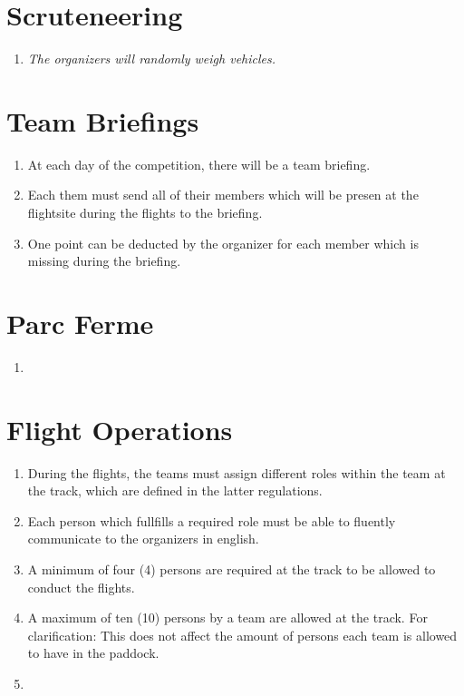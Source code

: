     \section{Scruteneering}
    \begin{enumerate}
      \item \emph{The organizers will randomly weigh vehicles.}
    \end{enumerate}

    \section{Team Briefings}
    \begin{enumerate}
      \item At each day of the competition, there will be a team briefing.
      \item Each them must send all of their members which will be presen at the flightsite during the flights to the briefing.
      \item One point can be deducted by the organizer for each member which is missing during the briefing. 
    \end{enumerate}

    \section{Parc Ferme}
    \begin{enumerate}
      \item 
    \end{enumerate}

    \section{Flight Operations}
    \begin{enumerate}
      \item During the flights, the teams must assign different roles within the team at the track, which are defined in the latter regulations.
      \item Each person which fullfills a required role must be able to fluently communicate to the organizers in english.
      \item A minimum of four (4) persons are required at the track to be allowed to conduct the flights.
      \item A maximum of ten (10) persons by a team are allowed at the track. For clarification: This does not affect the amount of persons each team is allowed to have in the paddock. 
      \item 
    \end{enumerate}

